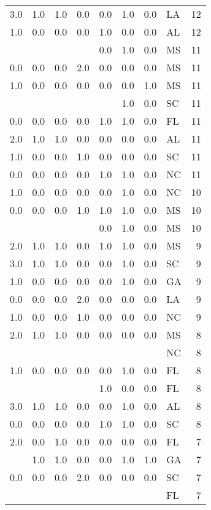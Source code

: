 \begin{tabular}{llllllllr}
3.0 & 1.0 & 1.0 & 0.0 & 0.0 & 1.0 & 0.0 & LA &    12 \\
1.0 & 0.0 & 0.0 & 0.0 & 1.0 & 0.0 & 0.0 & AL &    12 \\
    &     &     &     & 0.0 & 1.0 & 0.0 & MS &    11 \\
0.0 & 0.0 & 0.0 & 2.0 & 0.0 & 0.0 & 0.0 & MS &    11 \\
1.0 & 0.0 & 0.0 & 0.0 & 0.0 & 0.0 & 1.0 & MS &    11 \\
    &     &     &     &     & 1.0 & 0.0 & SC &    11 \\
0.0 & 0.0 & 0.0 & 0.0 & 1.0 & 1.0 & 0.0 & FL &    11 \\
2.0 & 1.0 & 1.0 & 0.0 & 0.0 & 0.0 & 0.0 & AL &    11 \\
1.0 & 0.0 & 0.0 & 1.0 & 0.0 & 0.0 & 0.0 & SC &    11 \\
0.0 & 0.0 & 0.0 & 0.0 & 1.0 & 1.0 & 0.0 & NC &    11 \\
1.0 & 0.0 & 0.0 & 0.0 & 0.0 & 1.0 & 0.0 & NC &    10 \\
0.0 & 0.0 & 0.0 & 1.0 & 1.0 & 1.0 & 0.0 & MS &    10 \\
    &     &     &     & 0.0 & 1.0 & 0.0 & MS &    10 \\
2.0 & 1.0 & 1.0 & 0.0 & 1.0 & 1.0 & 0.0 & MS &     9 \\
3.0 & 1.0 & 1.0 & 0.0 & 0.0 & 1.0 & 0.0 & SC &     9 \\
1.0 & 0.0 & 0.0 & 0.0 & 0.0 & 1.0 & 0.0 & GA &     9 \\
0.0 & 0.0 & 0.0 & 2.0 & 0.0 & 0.0 & 0.0 & LA &     9 \\
1.0 & 0.0 & 0.0 & 1.0 & 0.0 & 0.0 & 0.0 & NC &     9 \\
2.0 & 1.0 & 1.0 & 0.0 & 0.0 & 0.0 & 0.0 & MS &     8 \\
    &     &     &     &     &     &     & NC &     8 \\
1.0 & 0.0 & 0.0 & 0.0 & 0.0 & 1.0 & 0.0 & FL &     8 \\
    &     &     &     & 1.0 & 0.0 & 0.0 & FL &     8 \\
3.0 & 1.0 & 1.0 & 0.0 & 0.0 & 1.0 & 0.0 & AL &     8 \\
0.0 & 0.0 & 0.0 & 0.0 & 1.0 & 1.0 & 0.0 & SC &     8 \\
2.0 & 0.0 & 1.0 & 0.0 & 0.0 & 0.0 & 0.0 & FL &     7 \\
    & 1.0 & 1.0 & 0.0 & 0.0 & 1.0 & 1.0 & GA &     7 \\
0.0 & 0.0 & 0.0 & 2.0 & 0.0 & 0.0 & 0.0 & SC &     7 \\
    &     &     &     &     &     &     & FL &     7 \\

\end{tabular}
